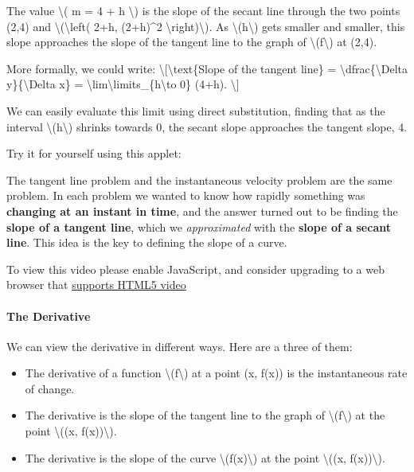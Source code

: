 The value \textbackslash{}( m = 4 + h \textbackslash{}) is the slope of
the secant line through the two points (2,4) and
\textbackslash{}(\textbackslash{}left( 2+h, (2+h)\^{}2
\textbackslash{}right)\textbackslash{}). As
\textbackslash{}(h\textbackslash{}) gets smaller and smaller, this slope
approaches the slope of the tangent line to the graph of
\textbackslash{}(f\textbackslash{}) at (2,4).

More formally, we could write:
\textbackslash{}{[}\textbackslash{}text\{Slope of the tangent line\} =
\textbackslash{}dfrac\{\textbackslash{}Delta y\}\{\textbackslash{}Delta
x\} = \textbackslash{}lim\textbackslash{}limits\_\{h\textbackslash{}to
0\} (4+h). \textbackslash{}{]}

We can easily evaluate this limit using direct substitution, finding
that as the interval \textbackslash{}(h\textbackslash{}) shrinks towards
0, the secant slope approaches the tangent slope, 4.

Try it for yourself using this applet:

\hypertarget{applet_container}{}

The tangent line problem and the instantaneous velocity problem are the
same problem. In each problem we wanted to know how rapidly something
was \textbf{changing at an instant in time}, and the answer turned out
to be finding the \textbf{slope of a tangent line}, which we
\emph{approximated} with the \textbf{slope of a secant line}. This idea
is the key to defining the slope of a curve.

To view this video please enable JavaScript, and consider upgrading to a
web browser that \href{http://videojs.com/html5-video-support/}{supports
HTML5 video}

\hypertarget{the-derivative}{%
\paragraph{The Derivative}\label{the-derivative}}

We can view the derivative in different ways. Here are a three of them:

\begin{itemize}
\tightlist
\item
  The derivative of a function \textbackslash{}(f\textbackslash{}) at a
  point (x, f(x)) is the instantaneous rate of change.
\item
  The derivative is the slope of the tangent line to the graph of
  \textbackslash{}(f\textbackslash{}) at the point \textbackslash{}((x,
  f(x))\textbackslash{}).
\item
  The derivative is the slope of the curve
  \textbackslash{}(f(x)\textbackslash{}) at the point
  \textbackslash{}((x, f(x))\textbackslash{}).
\end{itemize}

